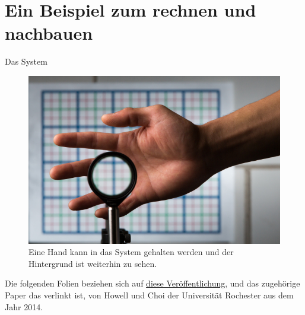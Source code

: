 \section{Ein Beispiel zum rechnen und nachbauen}

\begin{frame}{Das System}
  \begin{figure}
    \caption{Eine Hand kann in das System gehalten werden und der Hintergrund ist weiterhin zu sehen.}
    \centering
    \includegraphics[height=0.6\textheight]{images/hand-cloak.jpg}
  \end{figure}
  Die folgenden Folien beziehen sich auf
  \href{https://www.rochester.edu/newscenter/watch-rochester-cloak-uses-ordinary-lenses-to-hide-objects-across-continuous-range-of-angles-70592/}{diese Veröffentlichung},
  und das zugeh\"orige Paper das verlinkt ist,
  von Howell und Choi der Universität Rochester aus dem Jahr 2014.
\end{frame}

